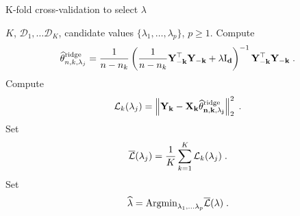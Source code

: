 \begin{algorithm}
\caption{K-fold cross-validation to select $\lambda$}\label{alg:cv:ridge}
\begin{algorithmic}
\Require $K$, $\mathcal{D}_1, \ldots \mathcal{D}_K$, candidate values $\{\lambda_1,\ldots,\lambda_p\}$, $p\geqslant 1$.
    \State Compute
$$
\widehat {\theta}^{\mathrm{ridge}}_{n,k,\lambda_j} = \frac{1}{n-n_k}\left(\frac{1}{n-n_k}\bf{Y}_{-k}^\top \bf{Y}_{-k} + \lambda \mathrm{I}_d\right)^{-1}\bf{Y}_{-k}^\top \bf{Y}_{-k}\;.
$$
    \State Compute
$$
\mathcal{L}_k(\lambda_j) = \left\|\bf{Y}_k - \bf{X}_k \widehat {\theta}^{\mathrm{ridge}}_{n,k,\lambda_j}\right\|_2^2\;.
$$ 
\EndFor
\State Set
$$
\overline{\mathcal{L}}(\lambda_j) = \frac{1}{K}\sum_{k=1}^{K}\mathcal{L}_k(\lambda_j)\;.
$$
\EndFor
\State Set
$$
\widehat \lambda = \mathrm{Argmin}_{\lambda_1,\ldots\lambda_p}\overline{\mathcal{L}}(\lambda)\;.
$$
\end{algorithmic}
\end{algorithm}
